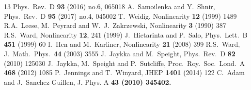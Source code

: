 \documentclass[12pt,a4paper]{article}
\begin{document}
\begin{small}
\begin{thebibliography}{13}
  Phys.\ Rev.\ D {\bf 93} (2016) no.6,  065018
  A.~Samoilenka and Y.~Shnir,
  Phys.\ Rev.\ D {\bf 95} (2017) no.4,  045002
 T.~Weidig, Nonlinearity {\bf 12} (1999) 1489
R.A.~Leese, M.~Peyrard and W.~J.~Zakrzewski, Nonlinearity {\bf 3} (1990) 387
R.S.~Ward,
  Nonlinearity {\bf 12}, 241 (1999)
  J.~Hietarinta and P.~Salo,
  Phys.\ Lett.\ B {\bf 451} (1999) 60
I.~Hen and M.~Karliner, Nonlinearity {\bf 21} (2008) 399
R.S.~Ward,  J.\ Math.\ Phys.\  {\bf 44} (2003) 3555
J.~Jaykka and M.~Speight, Phys.\ Rev.\ D {\bf 82} (2010) 125030
J.~Jaykka, M.~Speight and P.~Sutcliffe, Proc.\ Roy.\ Soc.\ Lond.\ A {\bf 468} (2012) 1085
  P.~Jennings and T.~Winyard,
  JHEP {\bf 1401} (2014) 122
  C.~Adam and J.~Sanchez-Guillen, J. Phys. A \bf{43}  (2010) 345402.

\end{thebibliography}
\end{small}

%
%
\end{document}

